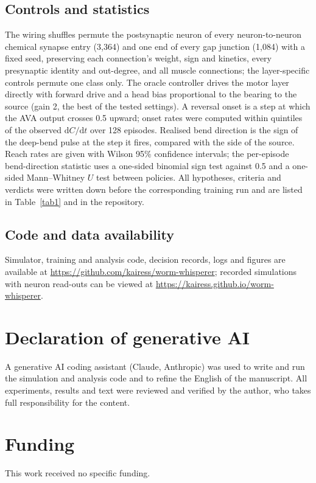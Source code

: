 \documentclass[11pt,a4paper]{article}
\begin{document}
\subsection*{Controls and statistics}
The wiring shuffles permute the postsynaptic neuron of every neuron-to-neuron chemical synapse entry (3,364) and one end of every gap junction (1,084) with a fixed seed, preserving each connection's weight, sign and kinetics, every presynaptic identity and out-degree, and all muscle connections; the layer-specific controls permute one class only. The oracle controller drives the motor layer directly with forward drive and a head bias proportional to the bearing to the source (gain 2, the best of the tested settings). A reversal onset is a step at which the AVA output crosses 0.5 upward; onset rates were computed within quintiles of the observed $\mathrm{d}C/\mathrm{d}t$ over 128 episodes. Realised bend direction is the sign of the deep-bend pulse at the step it fires, compared with the side of the source. Reach rates are given with Wilson 95\% confidence intervals; the per-episode bend-direction statistic uses a one-sided binomial sign test against 0.5 and a one-sided Mann--Whitney $U$ test between policies. All hypotheses, criteria and verdicts were written down before the corresponding training run and are listed in Table~\ref{tab1} and in the repository.

\subsection*{Code and data availability}
Simulator, training and analysis code, decision records, logs and figures are available at \url{https://github.com/kairess/worm-whisperer}; recorded simulations with neuron read-outs can be viewed at \url{https://kairess.github.io/worm-whisperer}.

\section*{Declaration of generative AI}
A generative AI coding assistant (Claude, Anthropic) was used to write and run the simulation and analysis code and to refine the English of the manuscript. All experiments, results and text were reviewed and verified by the author, who takes full responsibility for the content.

\section*{Funding}
This work received no specific funding.
\end{document}
